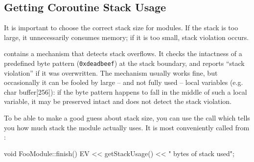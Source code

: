 %
%
%
%





\subsection{Getting Coroutine Stack Usage}

It is important to choose the correct stack size for
modules.  If the stack is
too large, it unnecessarily consumes memory; if it is too small, stack
violation occurs.

{\opp} contains a mechanism that detects stack
overflows. It checks the intactness of a
predefined byte pattern (\texttt{0xdeadbeef}) at the stack boundary,
and reports ``stack violation'' if it was
overwritten. The mechanism usually works fine, but occasionally it can
be fooled by large -- and not fully used -- local variables (e.g. char
buffer[256]): if the byte pattern happens to fall in the middle of
such a local variable, it may be preserved intact and {\opp} does not
detect the stack violation.

To be able to make a good guess about stack size, you can use
the  call which tells you how much stack the module
actually uses. It is most conveniently called from :

\begin{cpp}
void FooModule::finish()
{
  EV << getStackUsage() << " bytes of stack used\n";
}
\end{cpp}


